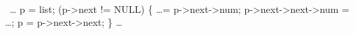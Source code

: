 {\tt
\begin{program}{10}
  \FL\ \ldots
   p = list;
   \WHILE (p->next != NULL) \{
       \ldots = p->next->num;
       p->next->next->num = \ldots;
       p = p->next->next;
   \}
   \ldots
\end{program}
}
